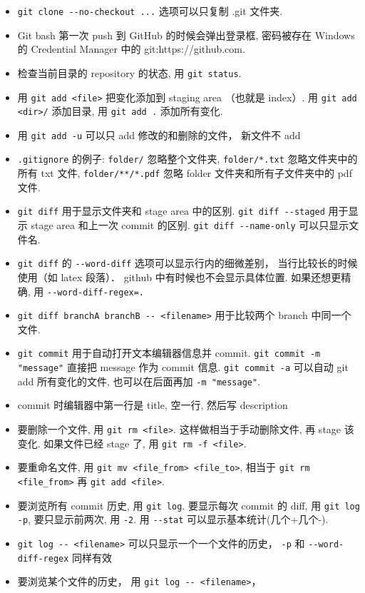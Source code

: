 \begin{itemize}
\item \verb|git clone --no-checkout ...| 选项可以只复制 .git 文件夹.
\item Git bash 第一次 push 到 GitHub 的时候会弹出登录框, 密码被存在 Windows 的 Credential Manager 中的 git:https://github.com.
\item 检查当前目录的 repository 的状态, 用 \verb|git status|. 
\item 用 \verb|git add <file>| 把变化添加到 staging area （也就是 index）. 用 \verb|git add <dir>/| 添加目录, 用 \verb|git add .| 添加所有变化.
\item 用 \verb|git add -u| 可以只 add 修改的和删除的文件， 新文件不 add
\item \verb|.gitignore| 的例子: \verb|folder/| 忽略整个文件夹, \verb|folder/*.txt| 忽略文件夹中的所有 txt 文件, \verb|folder/**/*.pdf| 忽略 folder 文件夹和所有子文件夹中的 pdf 文件.
\item \verb|git diff| 用于显示文件夹和 stage area 中的区别. \verb|git diff --staged| 用于显示 stage area 和上一次 commit 的区别. \verb|git diff --name-only| 可以只显示文件名.
\item \verb|git diff| 的 \verb|--word-diff| 选项可以显示行内的细微差别， 当行比较长的时候使用（如 latex 段落）． github 中有时候也不会显示具体位置. 如果还想更精确, 用 \verb|--word-diff-regex=.|
\item \verb|git diff branchA branchB -- <filename>| 用于比较两个 branch 中同一个文件.
\item \verb|git commit| 用于自动打开文本编辑器信息并 commit. \verb|git commit -m "message"| 直接把 message 作为 commit 信息. \verb|git commit -a| 可以自动 git add 所有变化的文件, 也可以在后面再加 \verb|-m "message"|.
\item commit 时编辑器中第一行是 title, 空一行, 然后写 description
\item 要删除一个文件, 用 \verb|git rm <file>|. 这样做相当于手动删除文件, 再 stage 该变化. 如果文件已经 stage 了, 用 \verb|git rm -f <file>|.
\item 要重命名文件, 用 \verb|git mv <file_from> <file_to>|, 相当于 \verb|git rm <file_from>| 再 \verb|git add <file>|.
\item 要浏览所有 commit 历史, 用 \verb|git log|. 要显示每次 commit 的 diff, 用 \verb|git log -p|, 要只显示前两次, 用 \verb|-2|. 用 \verb|--stat| 可以显示基本统计(几个+几个-).
\item \verb|git log -- <filename>| 可以只显示一个一个文件的历史， \verb|-p| 和 \verb|--word-diff-regex| 同样有效
\item 要浏览某个文件的历史， 用 \verb|git log -- <filename>|， 

\end{itemize}

